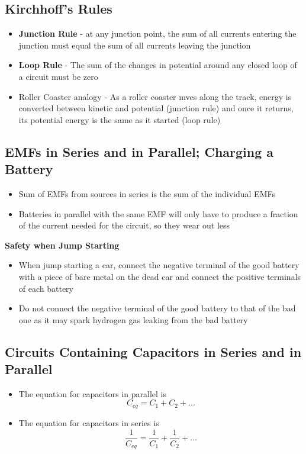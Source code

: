 \subsection{Kirchhoff's Rules}
\begin{itemize}
    \item \textbf{Junction Rule} - at any junction point, the sum of all currents entering the junction must equal the sum of all currents leaving the junction
    \item \textbf{Loop Rule} - The sum of the changes in potential around any closed loop of a circuit must be zero
    \item Roller Coaster analogy - As a roller coaster mves along the track, energy is converted between kinetic and potential (junction rule) and once it returns, its potential energy is the same as it started (loop rule)
\end{itemize}

\subsection{EMFs in Series and in Parallel; Charging a Battery}
\begin{itemize}
    \item Sum of EMFs from sources in series is the sum of the individual EMFs
    \item Batteries in parallel with the same EMF will only have to produce a fraction of the current needed for the circuit, so they wear out less
\end{itemize}

\textbf{Safety when Jump Starting}
\begin{itemize}
    \item When jump starting a car, connect the negative terminal of the good battery with a piece of bare metal on the dead car and connect the positive terminals of each battery
    \item  Do not connect the negative terminal of the good battery to that of the bad one as it may spark hydrogen gas leaking from the bad battery
\end{itemize}

\subsection{Circuits Containing Capacitors in Series and in Parallel}
\begin{itemize}
    \item The equation for capacitors in parallel is \[C_{eq}=C_1+C_2+...\]
    \item The equation for capacitors in series is \[\frac{1}{C_{eq}}=\frac{1}{C_1}+\frac{1}{C_2}+...\]
\end{itemize}

